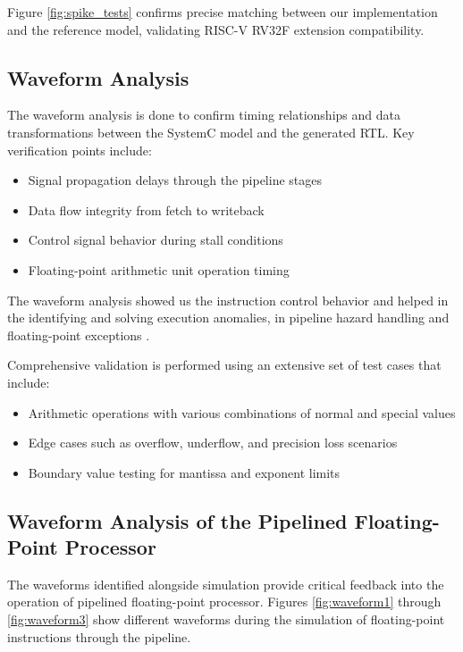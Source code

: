 \noindent Figure \ref{fig:spike_tests} confirms precise matching between our implementation and the reference model, validating RISC-V RV32F extension compatibility.

\newpage

\subsection{ Waveform Analysis}
\label{subsec:simulation_waveform}

The waveform analysis is done to confirm timing relationships and data transformations between the SystemC model and the generated RTL. Key verification points include:
\begin{itemize}
    \item Signal propagation delays through the pipeline stages
    \item Data flow integrity from fetch to writeback
    \item Control signal behavior during stall conditions
    \item Floating-point arithmetic unit operation timing
\end{itemize}

The waveform analysis showed us the instruction control behavior and helped in the identifying and solving execution anomalies, in pipeline hazard handling and floating-point exceptions \cite{ref18}.

Comprehensive validation is performed using an extensive set of test cases that include:
\begin{itemize}
    \item Arithmetic operations with various combinations of normal and special values
    \item Edge cases such as overflow, underflow, and precision loss scenarios
    \item Boundary value testing for mantissa and exponent limits
\end{itemize}

\subsection{Waveform Analysis of the Pipelined Floating-Point Processor}
\label{subsec:waveform_analysis}

The waveforms identified alongside simulation provide critical feedback into the operation of pipelined floating-point processor. Figures \ref{fig:waveform1} through \ref{fig:waveform3} show different waveforms during the simulation of floating-point instructions through the pipeline.


